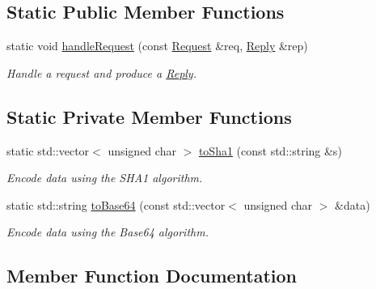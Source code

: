\subsection*{Static Public Member Functions}
\begin{DoxyCompactItemize}
\item 
static void \hyperlink{classwebsocket_1_1http_1_1RequestHandler_aca773bf228502c35351326f4b0dc67a9}{handle\+Request} (const \hyperlink{structwebsocket_1_1http_1_1Request}{Request} \&req, \hyperlink{structwebsocket_1_1http_1_1Reply}{Reply} \&rep)
\begin{DoxyCompactList}\small\item\em Handle a request and produce a \hyperlink{structwebsocket_1_1http_1_1Reply}{Reply}. \end{DoxyCompactList}\end{DoxyCompactItemize}
\subsection*{Static Private Member Functions}
\begin{DoxyCompactItemize}
\item 
static std\+::vector$<$ unsigned char $>$ \hyperlink{classwebsocket_1_1http_1_1RequestHandler_ab4c224809abbc4c70a4ee72a7d94639a}{to\+Sha1} (const std\+::string \&s)
\begin{DoxyCompactList}\small\item\em Encode data using the S\+H\+A1 algorithm. \end{DoxyCompactList}\item 
static std\+::string \hyperlink{classwebsocket_1_1http_1_1RequestHandler_ac685b82b354edc818177ad83574def0d}{to\+Base64} (const std\+::vector$<$ unsigned char $>$ \&data)
\begin{DoxyCompactList}\small\item\em Encode data using the Base64 algorithm. \end{DoxyCompactList}\end{DoxyCompactItemize}


\subsection{Member Function Documentation}
